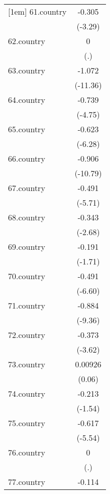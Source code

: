 {\begin{tabular}{l*{1}{c}}
[1em]
61.country  &      -0.305\sym{***}\\
            &     (-3.29)         \\
[1em]
62.country  &           0         \\
            &         (.)         \\
[1em]
63.country  &      -1.072\sym{***}\\
            &    (-11.36)         \\
[1em]
64.country  &      -0.739\sym{***}\\
            &     (-4.75)         \\
[1em]
65.country  &      -0.623\sym{***}\\
            &     (-6.28)         \\
[1em]
66.country  &      -0.906\sym{***}\\
            &    (-10.79)         \\
[1em]
67.country  &      -0.491\sym{***}\\
            &     (-5.71)         \\
[1em]
68.country  &      -0.343\sym{**} \\
            &     (-2.68)         \\
[1em]
69.country  &      -0.191         \\
            &     (-1.71)         \\
[1em]
70.country  &      -0.491\sym{***}\\
            &     (-6.60)         \\
[1em]
71.country  &      -0.884\sym{***}\\
            &     (-9.36)         \\
[1em]
72.country  &      -0.373\sym{***}\\
            &     (-3.62)         \\
[1em]
73.country  &     0.00926         \\
            &      (0.06)         \\
[1em]
74.country  &      -0.213         \\
            &     (-1.54)         \\
[1em]
75.country  &      -0.617\sym{***}\\
            &     (-5.54)         \\
[1em]
76.country  &           0         \\
            &         (.)         \\
[1em]
77.country  &      -0.114         \\

\end{tabular}}
